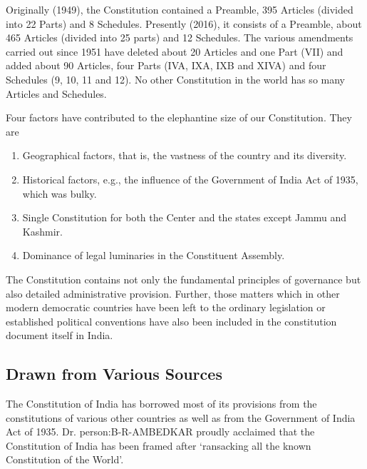 \begin{multicols}{2}
Originally (1949), the Constitution contained a Preamble, 395 Articles (divided into 22 Parts) and 8 Schedules. Presently (2016), it consists of a Preamble, about 465 Articles (divided into 25 parts) and 12 Schedules. The various amendments carried out since 1951 have deleted about 20 Articles and one Part (VII) and added about 90 Articles, four Parts (IVA, IXA, IXB and XIVA) and four Schedules (9, 10, 11 and 12). No other Constitution in the world has so many Articles and Schedules.

Four factors have contributed to the elephantine size of our Constitution. They are

\renewcommand{\labelenumi}{\textbf{(\alph{enumi})}}
\begin{enumerate}
  \item Geographical factors, that is, the vastness of the country and its diversity.
  \item Historical factors, e.g., the influence of the Government of India Act of 1935, which was bulky.
  \item Single Constitution for both the Center and the states except Jammu and Kashmir.
  \item Dominance of legal luminaries in the Constituent Assembly.
\end{enumerate}

The Constitution contains not only the fundamental principles of governance but also detailed administrative provision. Further, those matters which in other modern democratic countries have been left to the ordinary legislation or established political conventions have also been included in the constitution document itself in India.

\subsection{Drawn from Various Sources}

The Constitution of India has borrowed most of its provisions from the constitutions of various other countries as well as from the Government of India Act of 1935. Dr. \gls{person:B-R-AMBEDKAR} proudly acclaimed that the Constitution of India has been framed after `ransacking all the known Constitution of the World'.


\end{multicols}
